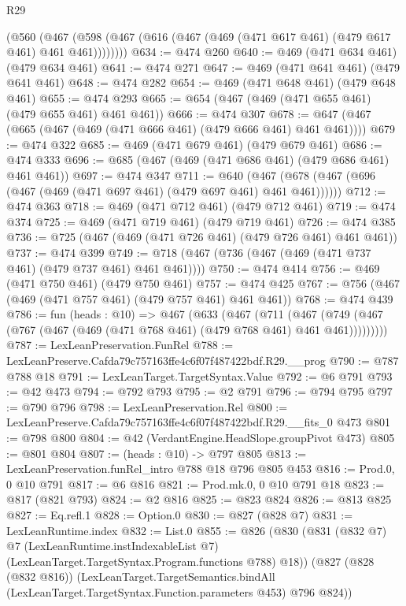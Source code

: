\begin{lexlean}{R29}
\begin{coremodule}
      (@560 (@467 (@598 (@467 (@616 (@467 (@469 (@471 @617 @461) (@479 @617 @461) @461 @461))))))))
@634 := @474 @260
@640 := @469 (@471 @634 @461) (@479 @634 @461)
@641 := @474 @271
@647 := @469 (@471 @641 @461) (@479 @641 @461)
@648 := @474 @282
@654 := @469 (@471 @648 @461) (@479 @648 @461)
@655 := @474 @293
@665 := @654 (@467 (@469 (@471 @655 @461) (@479 @655 @461) @461 @461))
@666 := @474 @307
@678 := @647 (@467 (@665 (@467 (@469 (@471 @666 @461) (@479 @666 @461) @461 @461))))
@679 := @474 @322
@685 := @469 (@471 @679 @461) (@479 @679 @461)
@686 := @474 @333
@696 := @685 (@467 (@469 (@471 @686 @461) (@479 @686 @461) @461 @461))
@697 := @474 @347
@711 := @640 (@467 (@678 (@467 (@696 (@467 (@469 (@471 @697 @461) (@479 @697 @461) @461 @461))))))
@712 := @474 @363
@718 := @469 (@471 @712 @461) (@479 @712 @461)
@719 := @474 @374
@725 := @469 (@471 @719 @461) (@479 @719 @461)
@726 := @474 @385
@736 := @725 (@467 (@469 (@471 @726 @461) (@479 @726 @461) @461 @461))
@737 := @474 @399
@749 := @718 (@467 (@736 (@467 (@469 (@471 @737 @461) (@479 @737 @461) @461 @461))))
@750 := @474 @414
@756 := @469 (@471 @750 @461) (@479 @750 @461)
@757 := @474 @425
@767 := @756 (@467 (@469 (@471 @757 @461) (@479 @757 @461) @461 @461))
@768 := @474 @439
@786 := fun (heads : @10) =>
  @467
    (@633
      (@467
        (@711
          (@467 (@749 (@467 (@767 (@467 (@469 (@471 @768 @461) (@479 @768 @461) @461 @461)))))))))
@787 := LexLeanPreservation.FunRel
@788 := LexLeanPreserve.Cafda79c757163ffe4c6f07f487422bdf.R29.__prog
@790 := @787 @788 @18
@791 := LexLeanTarget.TargetSyntax.Value
@792 := @6 @791
@793 := @42 @473
@794 := @792 @793
@795 := @2 @791
@796 := @794 @795
@797 := @790 @796
@798 := LexLeanPreservation.Rel
@800 := LexLeanPreserve.Cafda79c757163ffe4c6f07f487422bdf.R29.__fits_0 @473
@801 := @798 @800
@804 := @42 (VerdantEngine.HeadSlope.groupPivot @473)
@805 := @801 @804
@807 := (heads : @10) -> @797 @805
@813 := LexLeanPreservation.funRel_intro @788 @18 @796 @805 @453
@816 := Prod.{0, 0} @10 @791
@817 := @6 @816
@821 := Prod.mk.{0, 0} @10 @791 @18
@823 := @817 (@821 @793)
@824 := @2 @816
@825 := @823 @824
@826 := @813 @825
@827 := Eq.refl.{1}
@828 := Option.{0}
@830 := @827 (@828 @7)
@831 := LexLeanRuntime.index
@832 := List.{0}
@855 := @826
    (@830
      (@831
        (@832 @7)
        @7
        (LexLeanRuntime.instIndexableList @7)
        (LexLeanTarget.TargetSyntax.Program.functions @788)
        @18))
    (@827
      (@828 (@832 @816))
      (LexLeanTarget.TargetSemantics.bindAll
        (LexLeanTarget.TargetSyntax.Function.parameters @453)
        @796
        @824))

\end{coremodule}
\end{lexlean}
